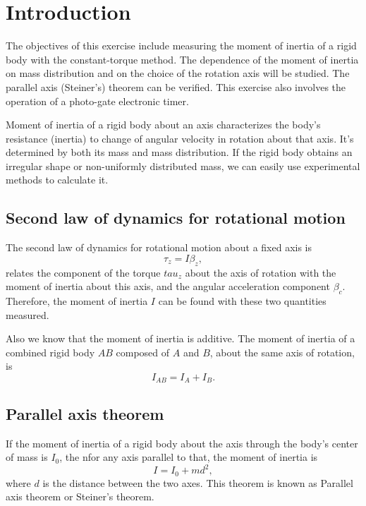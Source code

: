 \section{Introduction}
    The objectives of this exercise include measuring the moment of inertia of a rigid body with the constant-torque method. The dependence of the moment of inertia on mass distribution and on the choice of the rotation axis will be studied. The parallel axis (Steiner's) theorem can be verified. This exercise also involves the operation of a photo-gate electronic timer.

    Moment of inertia of a rigid body about an axis characterizes the body's resistance (inertia) to change of angular velocity in rotation about that axis. It's determined by both its mass and mass distribution. If the rigid body obtains an irregular shape or non-uniformly distributed mass, we can easily use experimental methods to calculate it.

\subsection{Second law of dynamics for rotational motion}
    The second law of dynamics for rotational motion about a fixed axis is 
    \begin{equation}
        \tau_z=I\beta_z,
    \end{equation}
    relates the component of the torque $tau_z$ about the axis of rotation with the moment of inertia about this axis, and the angular acceleration component $\beta_c$. Therefore, the moment of inertia $I$ can be found with these two quantities measured.

    Also we know that the moment of inertia is additive. The moment of inertia of a combined rigid body $AB$ composed of $A$ and $B$, about the same axis of rotation, is
    \[
        I_{AB}=I_A+I_B.
    \]

\subsection{Parallel axis theorem}
    If the moment of inertia of a rigid body about the axis through the body's center of mass is $I_0$, the nfor any axis parallel to that, the moment of inertia is
    \begin{equation}
        I=I_0+md^2,
    \end{equation}
    where $d$ is the distance between the two axes. This theorem is known as Parallel axis theorem or Steiner's theorem.